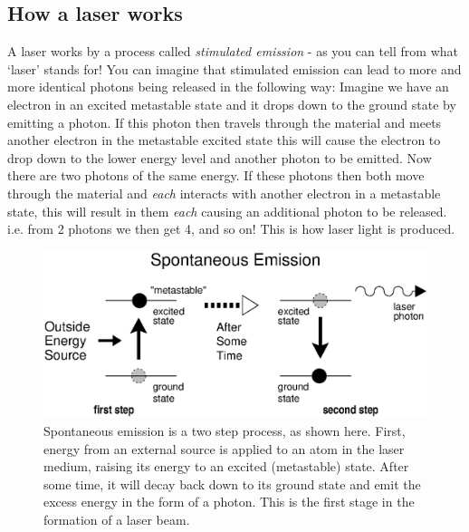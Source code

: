 \subsection{How a laser works}
A laser works by a process called \textit{stimulated emission} - as you can tell from what `laser' stands for! 
You can imagine that stimulated emission can lead to more and more identical photons being released in the following way: Imagine we have an electron in an excited metastable state and it drops down to the ground state by emitting a photon. If this photon then travels through the material and meets another electron in the metastable excited state this will cause the electron to drop down to the lower energy level and another photon to be emitted. Now there are two photons of the same energy. If these photons then both move through the material and \textit{each} interacts with another electron in a metastable state, this will result in them \textit{each} causing an additional photon to be released. i.e. from 2 photons we then get 4, and so on! This is how laser light is produced.

\begin{figure}[!h]
\begin{center}
\includegraphics[width=5.in]{../../epsimages/laser-spontaneous_2.eps}
\end{center}
\caption{Spontaneous emission is a two step process, as shown here.  First, energy from an external source is applied to an atom in the laser medium, raising its energy to an excited (metastable) state.  After some time, it will decay back down to its ground state and emit the excess energy in the form of a photon.  This is the first stage in the formation of a laser beam. }
\label{laserse}
\end{figure}

